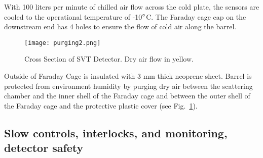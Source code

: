 With 100 liters per minute of chilled air flow across the cold plate, the sensors are cooled to the operational temperature of -10$\degree$C. The Faraday cage cap on the downstream end has 4 holes to ensure the flow of cold air along the barrel. 

\begin{figure}[hbt] 
\centering 
\texttt{[image: purging2.png]}
\caption{Cross Section of SVT Detector.  Dry air flow in yellow.}
\label{fig:purging2}
\end{figure}

Outside of Faraday Cage is insulated with 3 mm thick neoprene sheet. Barrel is protected from environment humidity by purging dry air between the scattering chamber and the inner shell of the Faraday cage and between the outer shell of the Faraday cage and the protective plastic cover (see Fig.~\ref{fig:purging2}). 

\subsection{Slow controls, interlocks, and monitoring, detector safety}

